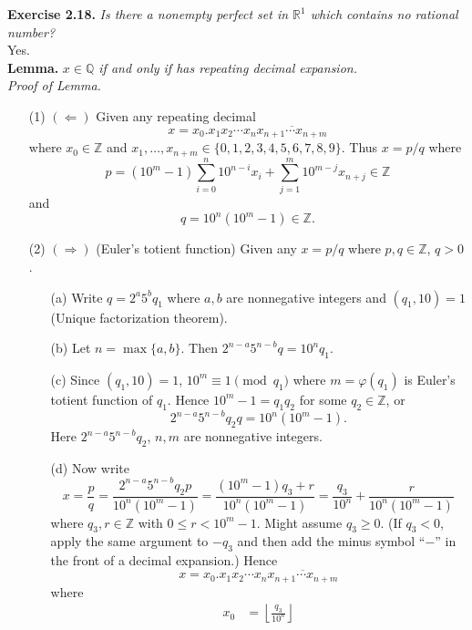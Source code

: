 \documentclass{article}
\begin{document}



\textbf{Exercise 2.18.}
\emph{Is there a nonempty perfect set in $\mathbb{R}^1$ which contains no rational number?} \\

Yes. \\

\textbf{Lemma.}
\emph{$x \in \mathbb{Q}$ if and only if has repeating decimal expansion.} \\

\emph{Proof of Lemma.}
\begin{enumerate}
\item[(1)]
$(\Longleftarrow)$
Given any repeating decimal
$$x = x_0.x_1 x_2 \cdots x_n \overline{x_{n+1} \cdots x_{n+m}}$$
where $x_0 \in \mathbb{Z}$ and $x_1, \ldots, x_{n+m} \in \{ 0,1,2,3,4,5,6,7,8,9 \}$.
Thus $x = p/q$
where
$$p = (10^m-1) \sum_{i=0}^{n}10^{n-i} x_i
+ \sum_{j=1}^{m} 10^{m-j} x_{n+j} \in \mathbb{Z}$$
and
$$q = 10^n(10^m-1) \in \mathbb{Z}.$$
\item[(2)]
$(\Longrightarrow)$
(Euler's totient function)
Given any $x = p/q$ where $p, q \in \mathbb{Z}$, $q > 0$.
  \begin{enumerate}
  \item[(a)]
  Write $q = 2^{a} 5^{b} q_1$ where $a, b$ are nonnegative integers and
  $(q_1, 10) = 1$ (Unique factorization theorem).
  \item[(b)]
  Let $n = \max\{a,b\}$. Then $2^{n-a} 5^{n-b} q = 10^n q_1$.
  \item[(c)]
  Since $(q_1, 10) = 1$,
  $10^m \equiv 1 \pmod{q_1}$ where $m = \varphi(q_1)$ is Euler's totient function of $q_1$.
  Hence
  $10^m - 1 = q_1 q_2$ for some $q_2 \in \mathbb{Z}$,
  or
  $$2^{n-a} 5^{n-b} q_2 q = 10^n(10^m-1).$$
  Here $2^{n-a} 5^{n-b} q_2$, $n, m$ are nonnegative integers.
  \item[(d)]
  Now write
  $$x = \frac{p}{q}
  = \frac{2^{n-a} 5^{n-b} q_2 p}{10^n(10^m-1)}
  = \frac{(10^m-1) q_3 + r}{10^n(10^m-1)}
  = \frac{q_3}{10^n} + \frac{r}{10^n(10^m-1)}$$
  where $q_3, r \in \mathbb{Z}$ with $0 \leq r < 10^m-1$.
  Might assume $q_3 \geq 0$.
  (If $q_3 < 0$, apply the same argument to $-q_3$
  and then add the minus symbol ``$-$'' in the front of a decimal expansion.)
  Hence
  $$x = x_0.x_1 x_2 \cdots x_n \overline{x_{n+1} \cdots x_{n+m}}$$
  where
  \begin{align*}
    x_0 &= \left\lfloor \frac{q_3}{10^n} \right\rfloor \\

\end{align*}
\end{enumerate}
\end{enumerate}
\end{document}
